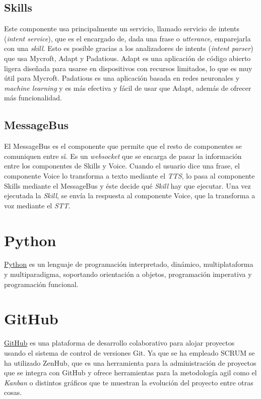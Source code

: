 \subsection{Skills\cite{TechnologyOverview}}

Este componente usa principalmente un servicio, llamado servicio de intents (\textit{intent service}), que es el encargado de, dada una frase o \textit{utterance}, emparejarla con una \textit{skill}. Esto es posible gracias a los analizadores de intents (\textit{intent parser}) que usa Mycroft, Adapt y Padatious.
Adapt es una aplicación de código abierto ligera diseñada para usarse en dispositivos con recursos limitados, lo que es muy útil para Mycroft. Padatious es una aplicación basada en redes neuronales y \textit{machine learning} y es más efectiva y fácil de usar que Adapt, además de ofrecer más funcionalidad.

\subsection{MessageBus\cite{MessageBus}}

El MessageBus es el componente que permite que el resto de componentes se comuniquen entre sí. Es un \textit{websocket} que se encarga de pasar la información entre los componentes de Skills y Voice. Cuando el usuario dice una frase, el componente Voice lo transforma a texto mediante el \textit{TTS}, lo pasa al componente Skills mediante el MessageBus y éste decide qué \textit{Skill} hay que ejecutar. Una vez ejecutada la \textit{Skill}, se envía la respuesta al componente Voice, que la transforma a voz mediante el \textit{STT}.


\section{Python}

\href{https://www.python.org/}{Python} \cite{Python2020} es un lenguaje de programación interpretado, dinámico, multiplataforma y multiparadigma, soportando orientación a objetos, programación imperativa y programación funcional.

\section{GitHub}

\href{https://github.com/}{GitHub} \cite{GitHub2020} es una plataforma de desarrollo colaborativo para alojar proyectos usando el sistema de control de versiones Git. Ya que se ha empleado SCRUM se ha utilizado ZenHub, que es una herramienta para la administración de proyectos que se integra con GitHub y ofrece herramientas para la metodología agil como el \textit{Kanban} o distintos gráficos que te muestran la evolución del proyecto entre otras cosas.

